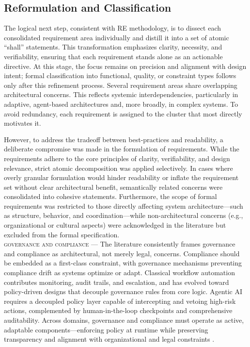 \subsection{Reformulation and Classification}\label{subsec:req-clas}
The logical next step, consistent with RE methodology, is to dissect each consolidated requirement area individually and distill it into a set of atomic “shall” statements. This transformation emphasizes clarity, necessity, and verifiability, ensuring that each requirement stands alone as an actionable directive. At this stage, the focus remains on precision and alignment with design intent; formal classification into functional, quality, or constraint types follows only after this refinement process. Several requirement areas share overlapping architectural concerns. This reflects systemic interdependencies, particularly in adaptive, agent-based architectures and, more broadly, in complex systems. To avoid redundancy, each requirement is assigned to the cluster that most directly motivates it.

However, to address the tradeoff between best-practices and readability, a deliberate compromise was made in the formulation of requirements. While the requirements adhere to the core principles of clarity, verifiability, and design relevance, strict atomic decomposition was applied selectively. In cases where overly granular formulation would hinder readability or inflate the requirement set without clear architectural benefit, semantically related concerns were consolidated into cohesive statements. Furthermore, the scope of formal requirements was restricted to those directly affecting system architecture—such as structure, behavior, and coordination—while non-architectural concerns (e.g., organizational or cultural aspects) were acknowledged in the literature but excluded from the formal specification. \\

\noindent \textsc{governance and compliance} --- The literature consistently frames governance and compliance as architectural, not merely legal, concerns. Compliance should be embedded as a first-class constraint, with governance mechanisms preventing compliance drift as systems optimize or adapt. Classical workflow automation contributes monitoring, audit trails, and escalation, and has evolved toward policy-driven designs that decouple governance rules from core logic. Agentic AI requires a decoupled policy layer capable of intercepting and vetoing high-risk actions, complemented by human-in-the-loop checkpoints and comprehensive auditability. Across domains, governance and compliance must operate as active, adaptable components—enforcing policy at runtime while preserving transparency and alignment with organizational and legal constraints \parencite{basuResearch2002, gauravGovernance2025}.

